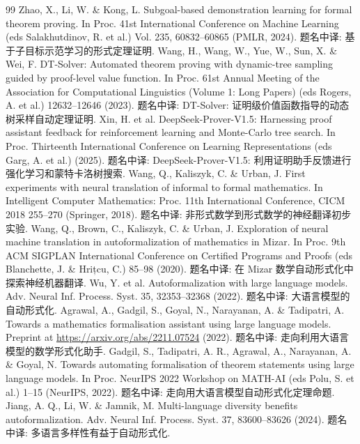 \begin{thebibliography}{99}
 Zhao, X., Li, W. \& Kong, L. Subgoal-based demonstration learning for formal theorem proving. In Proc. 41st International Conference on Machine Learning (eds Salakhutdinov, R. et al.) Vol. 235, 60832--60865 (PMLR, 2024). 题名中译: 基于子目标示范学习的形式定理证明.
 Wang, H., Wang, W., Yue, W., Sun, X. \& Wei, F. DT-Solver: Automated theorem proving with dynamic-tree sampling guided by proof-level value function. In Proc. 61st Annual Meeting of the Association for Computational Linguistics (Volume 1: Long Papers) (eds Rogers, A. et al.) 12632--12646 (2023). 题名中译: DT-Solver: 证明级价值函数指导的动态树采样自动定理证明.
 Xin, H. et al. DeepSeek-Prover-V1.5: Harnessing proof assistant feedback for reinforcement learning and Monte-Carlo tree search. In Proc. Thirteenth International Conference on Learning Representations (eds Garg, A. et al.) (2025). 题名中译: DeepSeek-Prover-V1.5: 利用证明助手反馈进行强化学习和蒙特卡洛树搜索.
 Wang, Q., Kaliszyk, C. \& Urban, J. First experiments with neural translation of informal to formal mathematics. In Intelligent Computer Mathematics: Proc. 11th International Conference, CICM 2018 255--270 (Springer, 2018). 题名中译: 非形式数学到形式数学的神经翻译初步实验.
 Wang, Q., Brown, C., Kaliszyk, C. \& Urban, J. Exploration of neural machine translation in autoformalization of mathematics in Mizar. In Proc. 9th ACM SIGPLAN International Conference on Certified Programs and Proofs (eds Blanchette, J. \& Hrițcu, C.) 85--98 (2020). 题名中译: 在 Mizar 数学自动形式化中探索神经机器翻译.
 Wu, Y. et al. Autoformalization with large language models. Adv. Neural Inf. Process. Syst. 35, 32353--32368 (2022). 题名中译: 大语言模型的自动形式化.
 Agrawal, A., Gadgil, S., Goyal, N., Narayanan, A. \& Tadipatri, A. Towards a mathematics formalisation assistant using large language models. Preprint at \url{https://arxiv.org/abs/2211.07524} (2022). 题名中译: 走向利用大语言模型的数学形式化助手.
 Gadgil, S., Tadipatri, A. R., Agrawal, A., Narayanan, A. \& Goyal, N. Towards automating formalisation of theorem statements using large language models. In Proc. NeurIPS 2022 Workshop on MATH-AI (eds Polu, S. et al.) 1--15 (NeurIPS, 2022). 题名中译: 走向用大语言模型自动形式化定理命题.
 Jiang, A. Q., Li, W. \& Jamnik, M. Multi-language diversity benefits autoformalization. Adv. Neural Inf. Process. Syst. 37, 83600--83626 (2024). 题名中译: 多语言多样性有益于自动形式化.

\end{thebibliography}
